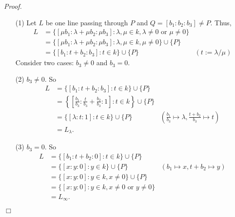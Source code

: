 \documentclass{article}
\begin{document}
\emph{Proof.}
\begin{enumerate}
\item[(1)]
  Let $L$ be one line passing through $P$ and $Q = [b_1 : b_2 : b_3] \neq P$.
  Thus,
  \begin{align*}
    L
    &= \{ [ \mu b_1 : \lambda + \mu b_2 : \mu b_3 ] :
        \lambda, \mu \in k, \lambda \neq 0 \text{ or } \mu \neq 0 \} \\
    &= \{ [ \mu b_1 : \lambda + \mu b_2 : \mu b_3 ] :
        \lambda, \mu \in k, \mu \neq 0 \} \cup \{ P \} \\
    &= \{ [ b_1 : t + b_2 : b_3 ] : t \in k \} \cup \{ P \}
      &(t := \lambda/\mu)
  \end{align*}
  Consider two cases: $b_3 \neq 0$ and $b_3 = 0$.

\item[(2)]
  $b_3 \neq 0$.
  So
  \begin{align*}
    L
    &= \{ [ b_1 : t + b_2 : b_3 ] : t \in k \} \cup \{ P \} \\
    &= \left\{
        \left[ \frac{b_1}{b_3} : \frac{t}{b_3} + \frac{b_2}{b_3} : 1 \right] : t \in k
      \right\} \cup \{ P \} \\
    &= \{ [ \lambda : t : 1 ] : t \in k \} \cup \{ P \}
      &\left( \frac{b_1}{b_3} \mapsto \lambda,  \frac{t+b_2}{b_3} \mapsto t \right) \\
    &= L_{\lambda}.
  \end{align*}

\item[(3)]
  $b_3 = 0$.
  So
  \begin{align*}
    L
    &= \{ [ b_1 : t + b_2 : 0 ] : t \in k \} \cup \{ P \} \\
    &= \{ [ x : y : 0 ] : y \in k \} \cup \{ P \}
      &(b_1 \mapsto x, t + b_2 \mapsto y) \\
    &= \{ [ x : y : 0 ] : y \in k, x \neq 0 \} \cup \{ P \} \\
    &= \{ [ x : y : 0 ] : y \in k, x \neq 0 \text{ or } y \neq 0 \} \\
    &= L_{\infty}.
  \end{align*}

\end{enumerate}
$\Box$ \\\\



\end{document}

